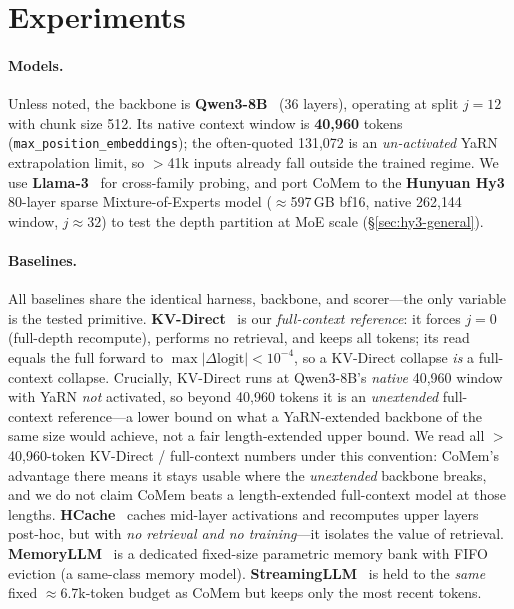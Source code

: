 \section{Experiments}
\label{sec:experiments}

\paragraph{Models.} Unless noted, the backbone is \textbf{Qwen3-8B}~\citep{qwen3}
(36 layers), operating at split $j{=}12$ with chunk size 512. Its native context
window is \textbf{40{,}960} tokens (\texttt{max\_position\_embeddings}); the
often-quoted 131{,}072 is an \emph{un-activated} YaRN extrapolation limit, so
$>$41k inputs already fall outside the trained regime. We use
\textbf{Llama-3}~\citep{llama3} for cross-family probing, and port CoMem to the
\textbf{Hunyuan Hy3}~\citep{hunyuan} 80-layer sparse
Mixture-of-Experts model ($\approx$597\,GB bf16, native 262{,}144 window,
$j{\approx}32$) to test the depth partition at MoE scale
(\S\ref{sec:hy3-general}).

\paragraph{Baselines.} All baselines share the identical harness, backbone, and
scorer---the only variable is the tested primitive.
\textbf{KV-Direct}~\citep{kvdirect} is our \emph{full-context reference}: it
forces $j{=}0$ (full-depth recompute), performs no retrieval, and keeps all
tokens; its read equals the full forward to $\max|\Delta\text{logit}|<10^{-4}$,
so a KV-Direct collapse \emph{is} a full-context collapse. Crucially, KV-Direct
runs at Qwen3-8B's \emph{native} 40{,}960 window with YaRN \emph{not} activated,
so beyond 40{,}960 tokens it is an \emph{unextended} full-context reference---a
lower bound on what a YaRN-extended backbone of the same size would achieve, not
a fair length-extended upper bound. We read all $>$40{,}960-token
KV-Direct / full-context numbers under this convention: CoMem's advantage there
means it stays usable where the \emph{unextended} backbone breaks, and we do not
claim CoMem beats a length-extended full-context model at those lengths.
\textbf{HCache}~\citep{hcache}
caches mid-layer activations and recomputes upper layers post-hoc, but with
\emph{no retrieval and no training}---it isolates the value of retrieval.
\textbf{MemoryLLM}~\citep{memoryllm} is a dedicated fixed-size parametric memory
bank with FIFO eviction (a same-class memory model). \textbf{StreamingLLM}~\citep{streamingllm}
is held to the \emph{same} fixed $\approx$6.7k-token budget as CoMem but keeps
only the most recent tokens.

